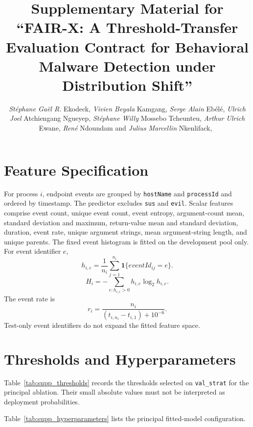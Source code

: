 \documentclass[10pt,journal,compsoc]{IEEEtran}
\begin{document}
\title{Supplementary Material for ``FAIR-X: A Threshold-Transfer Evaluation Contract for Behavioral Malware Detection under Distribution Shift''}

\author{\emph{St\'{e}phane Ga\"{e}l R.} Ekodeck, \emph{Vivien Beyala} Kamgang, \emph{Serge Alain} Eb\'{e}l\'{e}, \emph{Ulrich Joel} Atchiengang Ngueyep,  \emph{St\'{e}phane Willy} Mossebo Tcheunteu,  \emph{Arthur Ulrich} Ewane, \emph{Ren\'{e}} Ndoundam and \emph{Julius Marcellin} Nkenlifack,~}

\maketitle

\section{Feature Specification}

For process $i$, endpoint events are grouped by \texttt{hostName} and
\texttt{processId} and ordered by timestamp. The predictor excludes
\texttt{sus} and \texttt{evil}. Scalar features comprise event count, unique
event count, event entropy, argument-count mean, standard deviation and
maximum, return-value mean and standard deviation, duration, event rate,
unique argument strings, mean argument-string length, and unique parents.
The fixed event histogram is fitted on the development pool only. For event
identifier $e$,
\[
h_{i,e}=\frac{1}{n_i}\sum_{j=1}^{n_i}
\mathbf{1}\{eventId_{ij}=e\}.
\]
\[
H_i=-\sum_{e:h_{i,e}>0}h_{i,e}\log_2 h_{i,e}.
\]
The event rate is
\[
r_i=\frac{n_i}{(t_{i,n_i}-t_{i,1})+10^{-6}}.
\]
Test-only event identifiers do not expand the fitted feature space.

\section{Thresholds and Hyperparameters}

Table~\ref{tab:supp_thresholds} records the thresholds selected on
\texttt{val\_strat} for the principal ablation. Their small absolute values
must not be interpreted as deployment probabilities.

Table~\ref{tab:supp_hyperparameters} lists the principal fitted-model
configuration.
\end{document}
